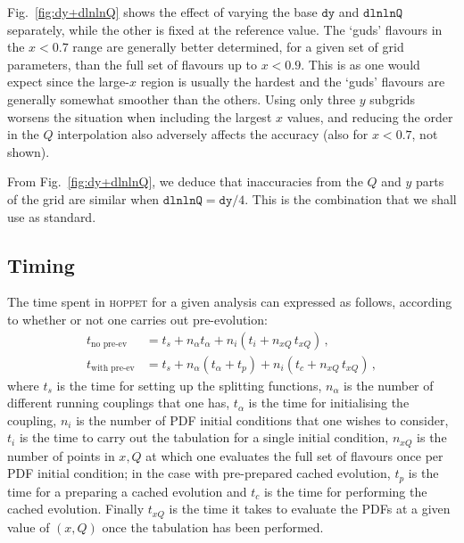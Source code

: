 \documentclass[12pt]{article}
\newcommand{\dy}{\ttt{dy}}
\newcommand{\dlnlnQ}{\ttt{dlnlnQ}}
\newcommand{\hoppet}{\textsc{hoppet}\xspace}
\newcommand{\ttt}[1]{\texttt{#1}}
\begin{document}
Fig.~\ref{fig:dy+dlnlnQ} shows the effect of varying the base $\dy$
and $\dlnlnQ$ separately, while the other is fixed at the reference
value. The `guds' flavours in the $x<0.7$ range are generally better
determined, for a given set of grid parameters, than the full set of
flavours up to $x<0.9$. This is as one would expect since the
large-$x$ region is usually the hardest and the `guds' flavours are
generally somewhat smoother than the others. Using only three $y$
subgrids worsens the situation when including the largest $x$ values,
and reducing the order in the $Q$ interpolation also adversely affects
the accuracy (also for $x<0.7$, not shown).

From Fig.~\ref{fig:dy+dlnlnQ}, we deduce that inaccuracies from the
$Q$ and $y$ parts of the grid are similar when $\dlnlnQ = \dy /4$.
This is the combination that we shall use as standard.


\subsection{Timing}
\label{sec:Timing}


The time spent in \hoppet for a given analysis can expressed as
follows, according to whether or not one carries out pre-evolution:
\begin{subequations}
  \label{eq:timing}
  \begin{align}
    t_\text{no pre-ev}   &= t_s + n_\alpha t_\alpha + n_i (t_i  + n_{xQ}\, t_{xQ})\,,\\
    t_\text{with pre-ev} &= t_s + n_\alpha (t_\alpha + t_p) + n_i (t_c + n_{xQ}\,
    t_{xQ})\,,
  \end{align}
\end{subequations}
where $t_s$ is the time for setting up the splitting functions,
$n_\alpha$ is the number of different running couplings that one has,
$t_\alpha$ is the time for initialising the coupling,
%
$n_i$ is the number of PDF initial conditions that one wishes to
consider, $t_i$ is the time to carry out the tabulation for a single
initial condition, $n_{xQ}$ is the number of points in $x,Q$ at which
one evaluates the full set of flavours once per PDF initial condition;
in the case with pre-prepared cached evolution, $t_p$ is the time for a
preparing a cached evolution and $t_c$ is the time for performing the
cached evolution. Finally $t_{xQ}$ is the time it takes to evaluate
the PDFs at a given value of $(x,Q)$ once the tabulation has
been performed.
\end{document}
